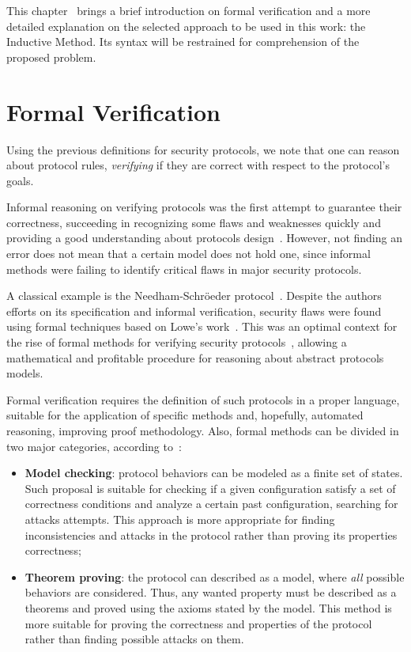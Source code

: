 This chapter~\label{chap:inductive} brings a brief introduction on formal verification and a more detailed explanation on the selected approach to be used in this work: the Inductive Method. Its syntax will be restrained for comprehension of the proposed problem.





\section{Formal Verification}
Using the previous definitions for security protocols, we note that one can reason about protocol rules, \textit{verifying} if they are correct with respect to the protocol's goals.

Informal reasoning on verifying protocols was the first attempt to guarantee their correctness, succeeding in recognizing some flaws and weaknesses quickly and providing a good understanding about protocols design~\cite{Bella2007}. However, not finding an error does not mean that a certain model does not hold one, since informal methods were failing to identify critical flaws in major security protocols.

A classical example is the Needham-Schröeder protocol~\cite{NeedhamSchroeder78}. Despite the authors efforts on its specification and informal verification, security flaws were found using formal techniques based on Lowe's work~\cite{Lowe96}. This was an optimal context for the rise of formal methods for verifying security protocols~\cite{Meadows96, Meadows94, Kemmerer94, Burrows90}, allowing a mathematical and profitable procedure for reasoning about abstract protocols models.

Formal verification requires the definition of such protocols in a proper language, suitable for the application of specific methods and, hopefully, automated reasoning, improving proof methodology. Also, formal methods can be divided in two major categories, according to~\cite{BoydMathuria2008}:

\begin{itemize}
  \item \textbf{Model checking}: protocol behaviors can be modeled as a finite set of states. Such proposal is suitable for checking if a given configuration satisfy a set of correctness conditions and analyze a certain past configuration, searching for attacks attempts. This approach is more appropriate for finding inconsistencies and attacks in the protocol rather than proving its properties correctness;

  \item \textbf{Theorem proving}: the protocol can described as a model, where \textit{all} possible behaviors are considered. Thus, any wanted property must be described as a theorems and proved using the axioms stated by the model. This method is more suitable for proving the correctness and properties of the protocol rather than finding possible attacks on them.
\end{itemize}



